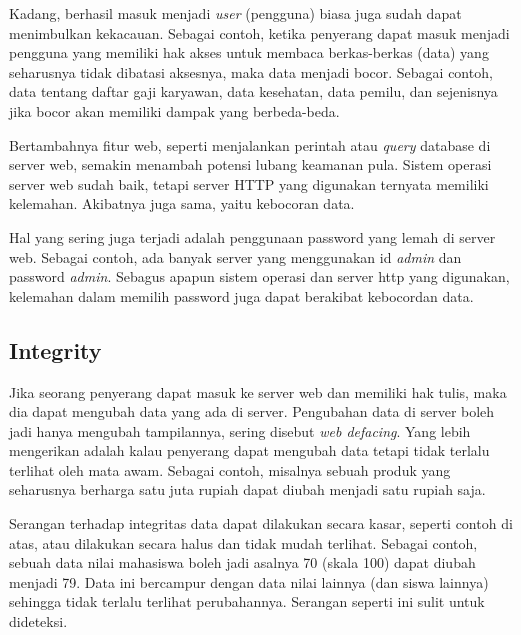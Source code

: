 Kadang, berhasil masuk menjadi {\em user} (pengguna) biasa juga sudah dapat
menimbulkan kekacauan. Sebagai contoh, ketika penyerang dapat masuk menjadi
pengguna yang memiliki hak akses untuk membaca berkas-berkas (data) yang
seharusnya tidak dibatasi aksesnya, maka data menjadi bocor. Sebagai contoh,
data tentang daftar gaji karyawan, data kesehatan, data pemilu, dan sejenisnya
jika bocor akan memiliki dampak yang berbeda-beda.

Bertambahnya fitur web, seperti menjalankan perintah atau {\em query} database
di server web, semakin menambah potensi lubang keamanan pula. Sistem operasi
server web sudah baik, tetapi server HTTP yang digunakan ternyata memiliki
kelemahan. Akibatnya juga sama, yaitu kebocoran data.

Hal yang sering juga terjadi adalah penggunaan password yang lemah di server
web. Sebagai contoh, ada banyak server yang menggunakan id {\em admin} dan
password {\em admin}. Sebagus apapun sistem operasi dan server http yang
digunakan, kelemahan dalam memilih password juga dapat berakibat kebocordan
data.


\subsection{Integrity}
Jika seorang penyerang dapat masuk ke server web dan memiliki hak tulis, maka
dia dapat mengubah data yang ada di server. Pengubahan data di server boleh
jadi hanya mengubah tampilannya, sering disebut {\em web defacing}. Yang lebih
mengerikan adalah kalau penyerang dapat mengubah data tetapi tidak terlalu
terlihat oleh mata awam. Sebagai contoh, misalnya sebuah produk yang seharusnya
berharga satu juta rupiah dapat diubah menjadi satu rupiah saja.

Serangan terhadap integritas data dapat dilakukan secara kasar, seperti contoh
di atas, atau dilakukan secara halus dan tidak mudah terlihat. Sebagai contoh,
sebuah data nilai mahasiswa boleh jadi asalnya 70 (skala 100) dapat diubah 
menjadi 79. Data ini bercampur dengan data nilai lainnya (dan siswa lainnya)
sehingga tidak terlalu terlihat perubahannya. Serangan seperti ini sulit untuk
dideteksi.
